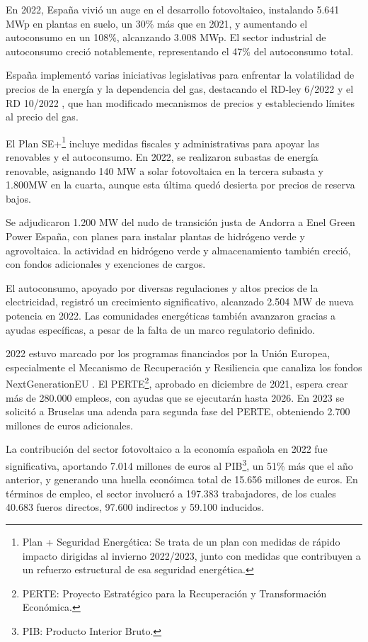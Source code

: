 En 2022, España vivió un auge en el desarrollo fotovoltaico, instalando 5.641 MWp en plantas en suelo, un 30\% más que en 2021, y aumentando el autoconsumo en un 108\%, alcanzando 3.008 MWp. El sector industrial de autoconsumo creció notablemente, representando el 47\% del autoconsumo total.

España implementó varias iniciativas legislativas para enfrentar la volatilidad de precios de la energía y la dependencia del gas, destacando el RD-ley 6/2022 \cite{boe622} y el RD 10/2022 \cite{boe1022}, que han modificado mecanismos de precios y estableciendo límites al precio del gas.

El Plan SE+\footnote{Plan + Seguridad Energética: Se trata de un plan con medidas de rápido impacto dirigidas al invierno 2022/2023, junto con medidas que contribuyen a un refuerzo estructural de esa seguridad energética.} \cite{demografico22} incluye medidas fiscales y administrativas para apoyar las renovables y el autoconsumo. En 2022, se realizaron subastas de energía renovable, asignando 140 MW a solar fotovoltaica en la tercera subasta y 1.800MW en la cuarta, aunque esta última quedó desierta por precios de reserva bajos.

Se adjudicaron 1.200 MW del nudo de transición justa de Andorra a Enel Green Power España, con planes para instalar plantas de hidrógeno verde y agrovoltaica. la actividad en hidrógeno verde y almacenamiento también creció, con fondos adicionales y exenciones de cargos.

El autoconsumo, apoyado por diversas regulaciones y altos precios de la electricidad, registró un crecimiento significativo, alcanzado 2.504 MW de nueva potencia en 2022. Las comunidades energéticas también avanzaron gracias a ayudas específicas, a pesar de la falta de un marco regulatorio definido.

2022 estuvo marcado por los programas financiados por la Unión Europea, especialmente el Mecanismo de Recuperación y Resiliencia \cite{hacienda22} que canaliza los fondos NextGenerationEU \cite{union20}. El PERTE\footnote{PERTE: Proyecto Estratégico para la Recuperación y Transformación Económica.}, aprobado en diciembre de 2021, espera crear más de 280.000 empleos, con ayudas que se ejecutarán hasta 2026. En 2023 se solicitó a Bruselas una adenda para segunda fase del PERTE, obteniendo 2.700 millones de euros adicionales.

La contribución del sector fotovoltaico a la economía española en 2022 fue significativa, aportando 7.014 millones de euros al PIB\footnote{PIB: Producto Interior Bruto.}, un 51\% más que el año anterior, y generando una huella econóimca total de 15.656 millones de euros. En términos de empleo, el sector involucró a 197.383 trabajadores, de los cuales 40.683 fueros directos, 97.600 indirectos y 59.100 inducidos.

